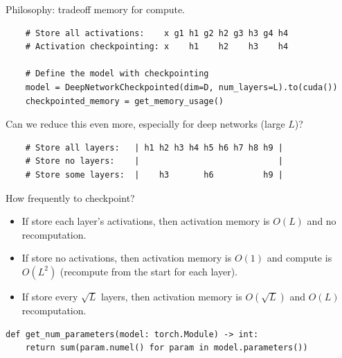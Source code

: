 \documentclass[12pt,twoside]{article}
\begin{document}
Philosophy: tradeoff memory for compute.

\begin{verbatim}
    # Store all activations:    x g1 h1 g2 h2 g3 h3 g4 h4
    # Activation checkpointing: x    h1    h2    h3    h4
    
    # Define the model with checkpointing
    model = DeepNetworkCheckpointed(dim=D, num_layers=L).to(cuda())  
    checkpointed_memory = get_memory_usage()
\end{verbatim}

Can we reduce this even more, especially for deep networks (large \(L\))?

\begin{verbatim}
    # Store all layers:   | h1 h2 h3 h4 h5 h6 h7 h8 h9 |
    # Store no layers:    |                            |
    # Store some layers:  |    h3       h6          h9 |
\end{verbatim}

How frequently to checkpoint?

\begin{itemize}
    \item If store each layer's activations, then activation memory is \(O(L)\) and no recomputation.
    \item If store no activations, then activation memory is \(O(1)\) and compute is \(O(L^2)\) (recompute from the start for each layer).
    \item If store every \(\sqrt{L}\) layers, then activation memory is \(O(\sqrt{L})\) and \(O(L)\) recomputation.
\end{itemize}

\begin{verbatim}
def get_num_parameters(model: torch.Module) -> int:
    return sum(param.numel() for param in model.parameters())
\end{verbatim}
\end{document}
